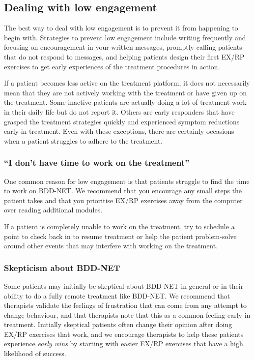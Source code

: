 \documentclass[]{book}
\theoremstyle{definition}
\theoremstyle{definition}
\theoremstyle{definition}
\theoremstyle{remark}
\begin{document}
\hypertarget{dealing-with-low-engagement}{%
\subsection{Dealing with low
engagement}\label{dealing-with-low-engagement}}

The best way to deal with low engagement is to prevent it from happening
to begin with. Strategies to prevent low engagement include writing
frequently and focusing on encouragement in your written messages,
promptly calling patients that do not respond to messages, and helping
patients design their first EX/RP exercises to get early experiences of
the treatment procedures in action.

If a patient becomes less active on the treatment platform, it does not
necessarily mean that they are not actively working with the treatment
or have given up on the treatment. Some inactive patients are actually
doing a lot of treatment work in their daily life but do not report it.
Others are early responders that have grasped the treatment strategies
quickly and experienced symptom reductions early in treatment. Even with
these exceptions, there are certainly occasions when a patient struggles
to adhere to the treatment.

\hypertarget{i-dont-have-time-to-work-on-the-treatment}{%
\subsubsection{``I don't have time to work on the
treatment''}\label{i-dont-have-time-to-work-on-the-treatment}}

One common reason for low engagement is that patients struggle to find
the time to work on BDD-NET. We recommend that you encourage any small
steps the patient takes and that you prioritise EX/RP exercises away
from the computer over reading additional modules.

If a patient is completely unable to work on the treatment, try to
schedule a point to check back in to resume treatment or help the
patient problem-solve around other events that may interfere with
working on the treatment.

\hypertarget{skepticism-about-bdd-net}{%
\subsubsection{Skepticism about
BDD-NET}\label{skepticism-about-bdd-net}}

Some patients may initially be skeptical about BDD-NET in general or in
their ability to do a fully remote treatment like BDD-NET. We recommend
that therapists validate the feelings of frustration that can come from
any attempt to change behaviour, and that therapists note that this as a
common feeling early in treatment. Initially skeptical patients often
change their opinion after doing EX/RP exercises that work, and we
encourage therapists to help these patients experience \emph{early wins}
by starting with easier EX/RP exercises that have a high likelihood of
success.
\end{document}
